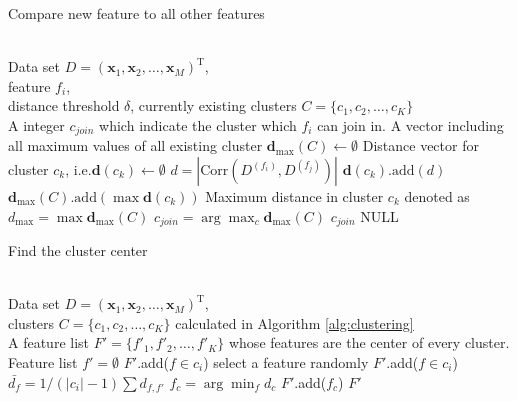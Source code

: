 \documentclass{ieeeaccess}
\theoremstyle{definition}
\begin{document}
    \begin{algorithm}
    \caption{Compare new feature to all other features}
    \label{alg:compare-and-join}
    \begin{algorithmic}[1]
    \REQUIRE ~~\\
        Data set $D=(\bm{x}_1,\bm{x}_2,\ldots,\bm{x}_M)^\text{T}$, \\
        feature $f_i$, \\
        distance threshold $\delta$,
        currently existing clusters $C=\{c_1, c_2, \ldots, c_K\}$
    \ENSURE ~~\\
        A integer $c_{join}$ which indicate the cluster which $f_i$ can join in.
    \STATE A vector including all maximum values of all existing cluster $\bm{d}_{\max}(C) \gets \emptyset$
        \STATE Distance vector for cluster $c_k$, i.e.$\bm{d}(c_k) \gets \emptyset$
            \STATE $d=|\text{Corr}(D^{(f_i)}, D^{(f_j)})|$
            \STATE $\bm{d}(c_k)\text{.add}(d)$
        \ENDFOR
        \STATE $\bm{d}_{\max}(C)\text{.add}(\max{\bm{d}(c_k)})$
    \ENDFOR
    \STATE Maximum distance in cluster $c_k$ denoted as $d_{\max}=\max{\bm{d}_{\max}(C)}$
        \STATE $c_{join}=\arg\max_c{\bm{d}_{\max}(C)}$
        \RETURN $c_{join}$
    \ELSE
        \RETURN NULL
    \ENDIF
    \end{algorithmic}
\end{algorithm}

\begin{algorithm}
    \caption{Find the cluster center}
    \label{alg:find-cluster-center}
    \begin{algorithmic}[1]
    \REQUIRE ~~\\
        Data set $D=(\bm{x}_1,\bm{x}_2,\ldots,\bm{x}_M)^\text{T}$, \\
        clusters $C=\{c_1, c_2, \ldots, c_K\}$ calculated in Algorithm \ref{alg:clustering}
    \ENSURE ~~\\
        A feature list $F'=\{f'_1, f'_2, \ldots, f'_K\}$ whose features are the center of every cluster.
    \STATE Feature list $f'=\emptyset$
            \STATE $F'$.add($f \in c_i$)
                \STATE select a feature randomly
                \STATE $F'$.add($f \in c_i$)
        \ELSE
                \STATE $\bar{d_f}=1/(|c_i|-1)\sum d_{f, f'}$
            \ENDFOR
            \STATE $f_c=\arg\min_f d_c$
            \STATE $F'$.add($f_c$)
        \ENDIF
    \ENDFOR
    \RETURN $F'$
    \end{algorithmic}
\end{algorithm}
        
\end{document}
